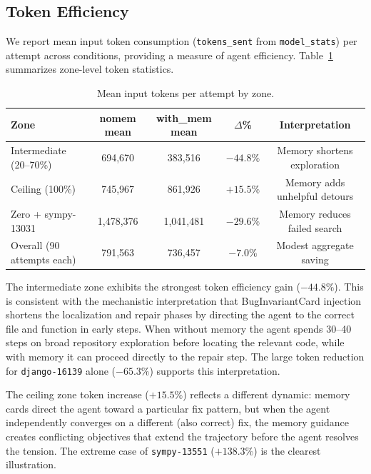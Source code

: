 \documentclass[runningheads]{llncs}
\begin{document}
\subsection{Token Efficiency}
\label{sec:tokens}

We report mean input token consumption (\texttt{tokens\_sent} from \texttt{model\_stats}) per attempt across conditions, providing a measure of agent efficiency. Table~\ref{tab:tokens} summarizes zone-level token statistics.

\begin{table}[h]
\centering
\caption{Mean input tokens per attempt by zone.}
\label{tab:tokens}
\begin{tabular}{lcccc}
\toprule
\textbf{Zone} & \textbf{nomem mean} & \textbf{with\_mem mean} & \textbf{$\Delta$\%} & \textbf{Interpretation} \\
\midrule
Intermediate (20--70\%) & 694,670 & 383,516 & $-44.8\%$ & Memory shortens exploration \\
Ceiling (100\%) & 745,967 & 861,926 & $+15.5\%$ & Memory adds unhelpful detours \\
Zero + sympy-13031 & 1,478,376 & 1,041,481 & $-29.6\%$ & Memory reduces failed search \\
\midrule
Overall (90 attempts each) & 791,563 & 736,457 & $-7.0\%$ & Modest aggregate saving \\
\bottomrule
\end{tabular}
\end{table}

The intermediate zone exhibits the strongest token efficiency gain ($-44.8\%$). This is consistent with the mechanistic interpretation that BugInvariantCard injection shortens the localization and repair phases by directing the agent to the correct file and function in early steps. When without memory the agent spends 30--40 steps on broad repository exploration before locating the relevant code, while with memory it can proceed directly to the repair step. The large token reduction for \texttt{django-16139} alone ($-65.3\%$) supports this interpretation.

The ceiling zone token increase ($+15.5\%$) reflects a different dynamic: memory cards direct the agent toward a particular fix pattern, but when the agent independently converges on a different (also correct) fix, the memory guidance creates conflicting objectives that extend the trajectory before the agent resolves the tension. The extreme case of \texttt{sympy-13551} ($+138.3\%$) is the clearest illustration.
\end{document}
